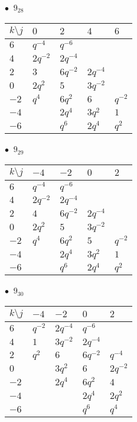 %
\begin{minipage}{\linewidth}
$\bullet\ $ $9_{28}$ \vspace{0.5em} \\
\begin{tabular}{l|llll}
$k \setminus j$ & $0$ & $2$ & $4$ & $6$ \\
\hline
$6$ & $q^{-4}$ & $q^{-6}$ &  &  \\
$4$ & $2q^{-2}$ & $2q^{-4}$ &  &  \\
$2$ & $3$ & $6q^{-2}$ & $2q^{-4}$ &  \\
$0$ & $2q^{2}$ & $5$ & $3q^{-2}$ &  \\
$-2$ & $q^{4}$ & $6q^{2}$ & $6$ & $q^{-2}$ \\
$-4$ &  & $2q^{4}$ & $3q^{2}$ & $1$ \\
$-6$ &  & $q^{6}$ & $2q^{4}$ & $q^{2}$ \\
\end{tabular}
\vspace{2em}
\end{minipage}
%
\begin{minipage}{\linewidth}
$\bullet\ $ $9_{29}$ \vspace{0.5em} \\
\begin{tabular}{l|llll}
$k \setminus j$ & $-4$ & $-2$ & $0$ & $2$ \\
\hline
$6$ & $q^{-4}$ & $q^{-6}$ &  &  \\
$4$ & $2q^{-2}$ & $2q^{-4}$ &  &  \\
$2$ & $4$ & $6q^{-2}$ & $2q^{-4}$ &  \\
$0$ & $2q^{2}$ & $5$ & $3q^{-2}$ &  \\
$-2$ & $q^{4}$ & $6q^{2}$ & $5$ & $q^{-2}$ \\
$-4$ &  & $2q^{4}$ & $3q^{2}$ & $1$ \\
$-6$ &  & $q^{6}$ & $2q^{4}$ & $q^{2}$ \\
\end{tabular}
\vspace{2em}
\end{minipage}
%
\begin{minipage}{\linewidth}
$\bullet\ $ $9_{30}$ \vspace{0.5em} \\
\begin{tabular}{l|llll}
$k \setminus j$ & $-4$ & $-2$ & $0$ & $2$ \\
\hline
$6$ & $q^{-2}$ & $2q^{-4}$ & $q^{-6}$ &  \\
$4$ & $1$ & $3q^{-2}$ & $2q^{-4}$ &  \\
$2$ & $q^{2}$ & $6$ & $6q^{-2}$ & $q^{-4}$ \\
$0$ &  & $3q^{2}$ & $6$ & $2q^{-2}$ \\
$-2$ &  & $2q^{4}$ & $6q^{2}$ & $4$ \\
$-4$ &  &  & $2q^{4}$ & $2q^{2}$ \\
$-6$ &  &  & $q^{6}$ & $q^{4}$ \\
\end{tabular}
\vspace{2em}
\end{minipage}
